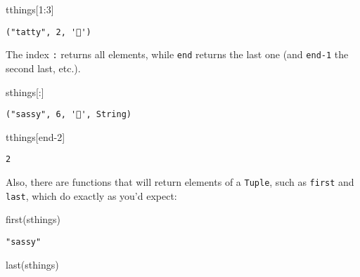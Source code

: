 \documentclass[
  letterpaper,
  DIV=11,
  numbers=noendperiod]{scrreprt}
\newenvironment{Shaded}{\begin{snugshade}}{\end{snugshade}}
\newcommand{\FloatTok}[1]{\textcolor[rgb]{0.68,0.00,0.00}{#1}}
\newcommand{\FunctionTok}[1]{\textcolor[rgb]{0.28,0.35,0.67}{#1}}
\newcommand{\KeywordTok}[1]{\textcolor[rgb]{0.00,0.23,0.31}{#1}}
\newcommand{\NormalTok}[1]{\textcolor[rgb]{0.00,0.23,0.31}{#1}}
\newcommand{\OperatorTok}[1]{\textcolor[rgb]{0.37,0.37,0.37}{#1}}
\begin{document}
\begin{Shaded}
\begin{Highlighting}[]
\NormalTok{tthings[}\FloatTok{1}\OperatorTok{:}\FloatTok{3}\NormalTok{]}
\end{Highlighting}
\end{Shaded}

\begin{verbatim}
("tatty", 2, '🐯')
\end{verbatim}

The index \texttt{:} returns all elements, while \texttt{end} returns
the last one (and \texttt{end-1} the second last, etc.).

\begin{Shaded}
\begin{Highlighting}[]
\NormalTok{sthings[}\OperatorTok{:}\NormalTok{]}
\end{Highlighting}
\end{Shaded}

\begin{verbatim}
("sassy", 6, '🐍', String)
\end{verbatim}

\begin{Shaded}
\begin{Highlighting}[]
\NormalTok{tthings[}\KeywordTok{end}\OperatorTok{{-}}\FloatTok{2}\NormalTok{]}
\end{Highlighting}
\end{Shaded}

\begin{verbatim}
2
\end{verbatim}

Also, there are functions that will return elements of a \texttt{Tuple},
such as \texttt{first} and \texttt{last}, which do exactly as you'd
expect:

\begin{Shaded}
\begin{Highlighting}[]
\FunctionTok{first}\NormalTok{(sthings)}
\end{Highlighting}
\end{Shaded}

\begin{verbatim}
"sassy"
\end{verbatim}

\begin{Shaded}
\begin{Highlighting}[]
\FunctionTok{last}\NormalTok{(sthings)}
\end{Highlighting}
\end{Shaded}
\end{document}
